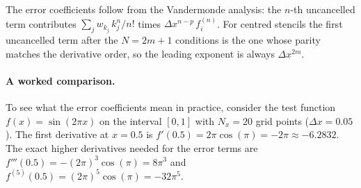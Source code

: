 \vspace{0.5\baselineskip}
\noindent{}

\vspace{0.5\baselineskip}
\noindent The error coefficients follow from the Vandermonde analysis: the $n$-th
uncancelled term contributes $\sum_j w_{k_j}\,k_j^n / n!$ times
$\Delta x^{n-p}\,f^{(n)}_i$.  For centred stencils the first uncancelled
term after the $N = 2m + 1$ conditions is the one whose parity matches
the derivative order, so the leading exponent is always $\Delta x^{2m}$.

\paragraph{A worked comparison.}

To see what the error coefficients mean in practice, consider the test
function $f(x) = \sin(2\pi x)$ on the interval $[0, 1]$ with $N_x = 20$
grid points ($\Delta x = 0.05$).  The first derivative at $x = 0.5$ is
$f'(0.5) = 2\pi\cos(\pi) = -2\pi \approx -6.2832$.  The exact higher
derivatives needed for the error terms are
$f'''(0.5) = -(2\pi)^3\cos(\pi) = 8\pi^3$
and $f^{(5)}(0.5) = (2\pi)^5\cos(\pi) = -32\pi^5$.

